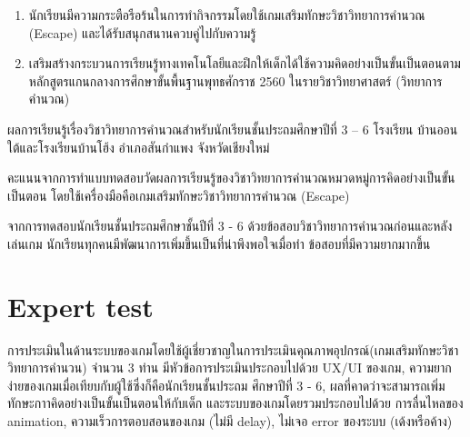 \begin{enumerate}
    \item นักเรียนมีความกระตือรือร้นในการทำกิจกรรมโดยใช้เกมเสริมทักษะวิชาวิทยาการคำนวณ (Escape) และได้รับสนุกสนานควบคู่ไปกับความรู้ 
    \item เสริมสร้างกระบวนการเรียนรู้ทางเทคโนโลยีและฝึกให้เด็กได้ใช้ความคิดอย่างเป็นขั้นเป็นตอนตามหลักสูตรแกนกลางการศึกษาขั้นพื้นฐานพุทธศักราช 2560 ในรายวิชาวิทยาศาสตร์ (วิทยาการคำนวณ)
\end{enumerate}
ผลการเรียนรู้เรื่องวิชาวิทยาการคำนวณสำหรับนักเรียนชั้นประถมศึกษาปีที่ 3 – 6 โรงเรียน บ้านออนใต้และโรงเรียนบ้านโฮ้ง อำเภอสันกำแพง จังหวัดเชียงใหม่\par
คะแนนจากการทำแบบทดสอบวัดผลการเรียนรู้ของวิชาวิทยาการคำนวณหมวดหมู่การคิดอย่างเป็นขั้นเป็นตอน โดยใช้เครื่องมือคือเกมเสริมทักษะวิชาวิทยาการคำนวณ (Escape)\par
\bigskip

\bigskip

จากการทดสอบนักเรียนชั้นประถมศึกษาชั้นปีที่ 3 - 6 ด้วยข้อสอบวิชาวิทยาการคำนวณก่อนและหลังเล่นเกม นักเรียนทุกคนมีพัฒนาการเพิ่มขึ้นเป็นที่น่าพึงพอใจเมื่อทำ
ข้อสอบที่มีความยากมากขึ้น


\section{Expert test}
การประเมินในด้านระบบของเกมโดยใช้ผู้เชี่ยวชาญในการประเมินคุณภาพอุปกรณ์(เกมเสริมทักษะวิชาวิทยาการคำนวน) จำนวน 3 ท่าน มีหัวข้อการประเมินประกอบไปด้วย UX/UI ของเกม, ความยากง่ายของเกมเมื่อเทียบกับผู้ใช้ซึ่งก็คือนักเรียนชั้นประถม
ศึกษาปีที่ 3 - 6, ผลที่คาดว่าจะสามารถเพิ่มทักษะกาาคิดอย่างเป็นขั้นเป็นตอนให้กับเด็ก และระบบของเกมโดยรวมประกอบไปด้วย 
การลื่นไหลของ animation, ความเร็วการตอบสอนของเกม (ไม่มี delay), ไม่เจอ error ของระบบ (เด้งหรือค้าง)
